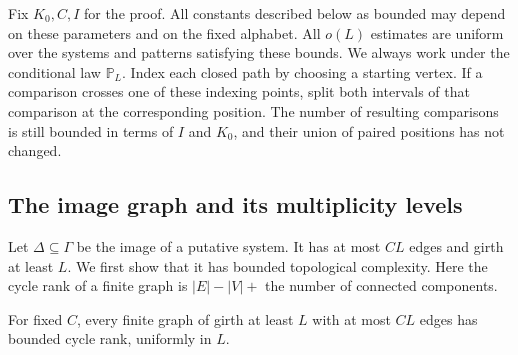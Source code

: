Fix $K_0,C,I$ for the proof.  All constants described below as bounded
may depend on these parameters and on the fixed alphabet.  All
$o(L)$ estimates are uniform over the systems and patterns satisfying
these bounds.  We always work under the conditional law $\mathbb P_L$.
Index each closed path by choosing a starting vertex.  If a comparison
crosses one of these indexing points, split both intervals of that
comparison at the corresponding position.  The number of resulting
comparisons is still bounded in terms of $I$ and $K_0$, and their union
of paired positions has not changed.

\subsection{The image graph and its multiplicity levels}

Let $\Delta\subseteq\Gamma$ be the image of a putative system.  It has
at most $CL$ edges and girth at least $L$.  We first show that it has
bounded topological complexity.  Here the cycle rank of a finite graph
is $|E|-|V|+$ the number of connected components.

\begin{lemma}\label{lem:bounded-image-rank}
For fixed $C$, every finite graph of girth at least $L$ with at most
$CL$ edges has bounded cycle rank, uniformly in $L$.
\end{lemma}

